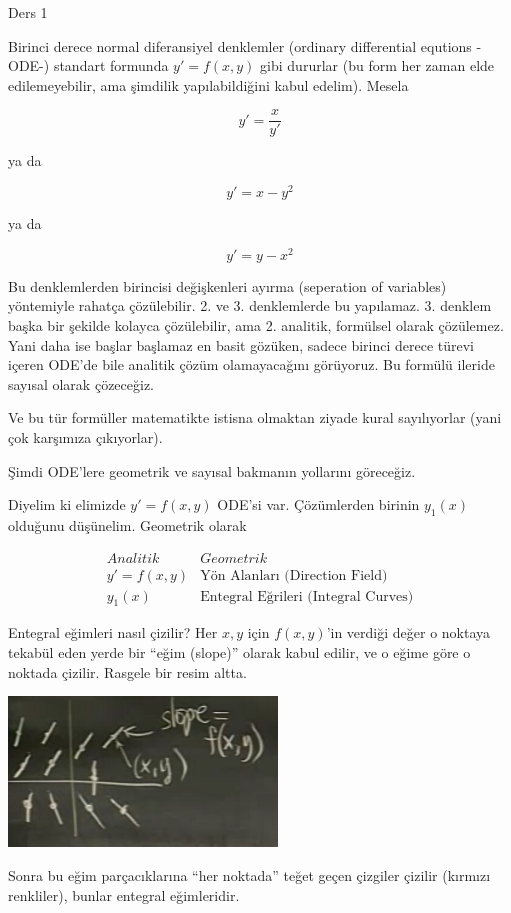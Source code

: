 \documentclass[12pt,fleqn]{article}\usepackage{../../common}
\begin{document}
Ders 1

Birinci derece normal diferansiyel denklemler (ordinary differential equtions
-ODE-) standart formunda $y'=f(x,y)$ gibi dururlar (bu form her zaman
elde edilemeyebilir, ama şimdilik yapılabildiğini kabul edelim).  Mesela

$$ y' = \frac{x}{y'} $$ 

ya da

$$y' = x-y^2$$

ya da

$$y' = y-x^2$$

Bu denklemlerden birincisi değişkenleri ayırma (seperation of variables)
yöntemiyle rahatça çözülebilir. 2. ve 3. denklemlerde bu
yapılamaz. 3. denklem başka bir şekilde kolayca çözülebilir, ama
2. analitik, formülsel olarak çözülemez. Yani daha ise başlar başlamaz en
basit gözüken, sadece birinci derece türevi içeren ODE'de bile analitik
çözüm olamayacağını görüyoruz. Bu formülü ileride sayısal olarak çözeceğiz.

Ve bu tür formüller matematikte istisna olmaktan ziyade kural sayılıyorlar (yani
çok karşımıza çıkıyorlar). 

Şimdi ODE'lere geometrik ve sayısal bakmanın yollarını göreceğiz.

Diyelim ki elimizde $y' = f(x,y)$ ODE'si var. Çözümlerden birinin
$y_1(x)$ olduğunu düşünelim. Geometrik olarak 

$$
\begin{array}{cc}
Analitik & Geometrik \\
\hline
y' = f(x,y)  & \textrm{Yön Alanları (Direction Field)} \\
y_1(x)  & \textrm{Entegral Eğrileri (Integral Curves)}
\end{array}
$$

Entegral eğimleri nasıl çizilir? Her $x,y$ için $f(x,y)$'in verdiği değer o
noktaya tekabül eden yerde bir ``eğim (slope)'' olarak kabul edilir, ve o eğime
göre o noktada çizilir. Rasgele bir resim altta.

\includegraphics[height=4cm]{./1_1.png}

Sonra bu eğim parçacıklarına ``her noktada'' teğet geçen çizgiler çizilir
(kırmızı renkliler), bunlar entegral eğimleridir.
\end{document}
